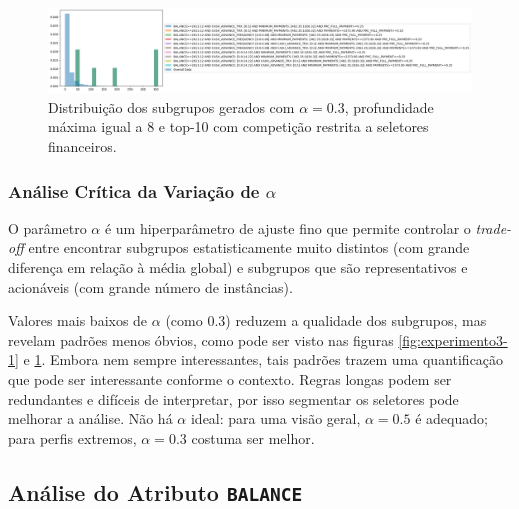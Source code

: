\documentclass[12pt]{article}
\begin{document}
\begin{figure}[h] \centering
    \includegraphics[width=1\textwidth]{imagens/experimento2.2.png}
    \caption{Distribuição dos subgrupos gerados com $\alpha = 0.3$, profundidade máxima igual a 8 e top-10 com competição restrita a seletores financeiros.}
    \label{fig:experimento3-2}
\end{figure}

\vspace{-0.5\baselineskip}

\subsubsection{Análise Crítica da Variação de $\alpha$}

\hspace{1.2cm}O parâmetro $\alpha$ é um hiperparâmetro de ajuste fino que permite controlar o \textit{trade-off} entre encontrar subgrupos estatisticamente muito distintos (com grande diferença em relação à média global) e subgrupos que são representativos e acionáveis (com grande número de instâncias).

Valores mais baixos de $\alpha$ (como 0.3) reduzem a qualidade dos subgrupos, mas revelam padrões menos óbvios, como pode ser visto nas figuras \ref{fig:experimento3-1} e \ref{fig:experimento3-2}. Embora nem sempre interessantes, tais padrões trazem uma quantificação que pode ser interessante conforme o contexto. Regras longas podem ser redundantes e difíceis de interpretar, por isso segmentar os seletores pode melhorar a análise. Não há $\alpha$ ideal: para uma visão geral, $\alpha = 0.5$ é adequado; para perfis extremos, $\alpha = 0.3$ costuma ser melhor.

\subsection{Análise do Atributo \texttt{BALANCE}}
\end{document}
